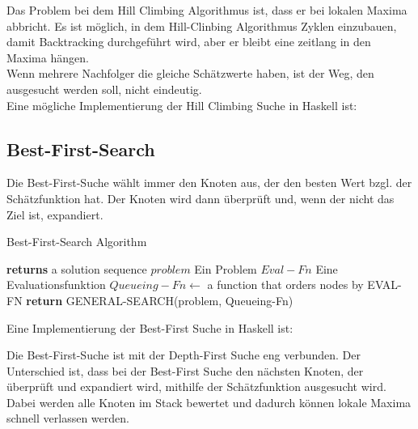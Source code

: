 \documentclass[fleqn]{article}
\numberwithin{equation}{section}
\numberwithin{figure}{section}
\numberwithin{table}{section}
\begin{document}
Das Problem bei dem Hill Climbing Algorithmus ist, dass er bei lokalen Maxima abbricht. Es ist möglich, in dem Hill-Clinbing Algorithmus Zyklen einzubauen, damit Backtracking durchgeführt wird, aber er bleibt eine zeitlang in den Maxima hängen.\\

Wenn mehrere Nachfolger die gleiche Schätzwerte haben, ist der Weg, den ausgesucht werden soll, nicht eindeutig.\\

Eine mögliche Implementierung der Hill Climbing Suche in Haskell ist:\\

\bigskip



\bigskip

\subsection{Best-First-Search}
\bigskip
Die Best-First-Suche wählt immer den Knoten aus, der den besten Wert bzgl. der Schätzfunktion hat. Der Knoten wird dann überprüft und, wenn der nicht das Ziel ist, expandiert.\\


\begin{algorithm}
\caption{Best-First-Search Algorithm}
\begin{algorithmic}[1]
 \State \textbf{returns} a solution sequence
\INPUT
\Statex $problem$ \Comment Ein Problem
\Statex $Eval-Fn$  \Comment Eine Evaluationsfunktion
\State $Queueing-Fn \gets$ a function that orders nodes by EVAL-FN
\State \textbf{return} GENERAL-SEARCH(problem, Queueing-Fn)
\EndFunction
\end{algorithmic}
\end{algorithm}


Eine Implementierung der Best-First Suche in Haskell ist:\\

\newpage



\bigskip

Die Best-First-Suche ist mit der Depth-First Suche eng verbunden. Der Unterschied ist, dass bei der Best-First Suche den nächsten Knoten, der überprüft und expandiert wird, mithilfe der Schätzfunktion ausgesucht wird. Dabei werden alle Knoten im Stack bewertet und dadurch können lokale Maxima schnell verlassen werden.\\
\end{document}
